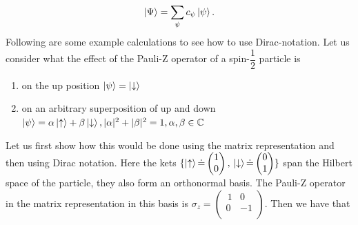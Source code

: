 \begin{equation}
\ket{\Psi} = \sum_{\psi} c_{\psi}\ket{\psi}.
\end{equation}
Following are some example calculations to see how to use Dirac-notation. Let us consider what the effect of the Pauli-Z operator of a spin-$\dfrac{1}{2}$ particle is
\begin{enumerate}[label=\textbf{\alph*)}]
\item on the up position $\ket{\psi} = \ket{\downarrow}$

\item on an arbitrary superposition of up and down $\ket{\psi} = \alpha \ket{\uparrow} + \beta\ket{\downarrow}, |\alpha|^2 + |\beta|^2 = 1, \alpha,\beta \in \mathbb{C}$
\end{enumerate}
Let us first show how this would be done using the matrix representation and then using Dirac notation.
Here the kets $\{\ket{\uparrow} \dot{=} \begin{pmatrix}
1 \\ 0
\end{pmatrix}, \, \ket{\downarrow} \dot{=} \begin{pmatrix}
0 \\ 1
\end{pmatrix} \}$ span the Hilbert space of the particle, they also form an orthonormal basis. The Pauli-Z operator in the matrix representation in this basis is $\sigma_z = \begin{pmatrix}
\,1 & 0 \\
0 & -1 \\
\end{pmatrix}$. Then we have that 

